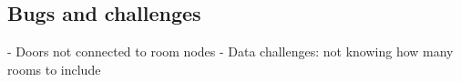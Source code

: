 \subsection{Bugs and challenges}
- Doors not connected to room nodes
- Data challenges: not knowing how many rooms to include




\begin{comment}
\subsubsection{Line intersection}
When determining whether to points on a map are traversable some sort of line intersection algorithm is used. Without using
line intersection the program wouldn't be able to detect whether there are walls between two points, and it would therefore always
choose the shortest distance between two points to be a straight line, regardless if it passes through walls or not. 
(insert reference https://bryceboe.com/2006/10/23/line-segment-intersection-algorithm/)
The algorithm chosen in this case works by checking first if three points are counterclockwise of each other.
\end{comment}

